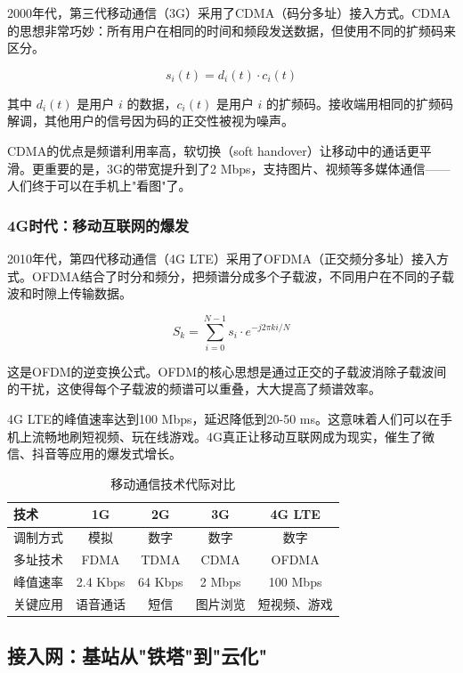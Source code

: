 2000年代，第三代移动通信（3G）采用了CDMA（码分多址）接入方式。CDMA的思想非常巧妙：所有用户在相同的时间和频段发送数据，但使用不同的扩频码来区分。

\begin{equation}
s_i(t) = d_i(t) \cdot c_i(t)
\end{equation}

其中 $d_i(t)$ 是用户 $i$ 的数据，$c_i(t)$ 是用户 $i$ 的扩频码。接收端用相同的扩频码解调，其他用户的信号因为码的正交性被视为噪声。

CDMA的优点是频谱利用率高，软切换（soft handover）让移动中的通话更平滑。更重要的是，3G的带宽提升到了2 Mbps，支持图片、视频等多媒体通信——人们终于可以在手机上"看图"了。

\subsubsection{4G时代：移动互联网的爆发}

2010年代，第四代移动通信（4G LTE）采用了OFDMA（正交频分多址）接入方式。OFDMA结合了时分和频分，把频谱分成多个子载波，不同用户在不同的子载波和时隙上传输数据。

\begin{equation}
S_k = \sum_{i=0}^{N-1} s_i \cdot e^{-j 2\pi ki/N}
\end{equation}

这是OFDM的逆变换公式。OFDM的核心思想是通过正交的子载波消除子载波间的干扰，这使得每个子载波的频谱可以重叠，大大提高了频谱效率。

4G LTE的峰值速率达到100 Mbps，延迟降低到20-50 ms。这意味着人们可以在手机上流畅地刷短视频、玩在线游戏。4G真正让移动互联网成为现实，催生了微信、抖音等应用的爆发式增长。

\begin{table}[htbp]
\centering
\caption{移动通信技术代际对比}
\begin{tabular}{|l|c|c|c|c|}
\hline
\textbf{技术} & \textbf{1G} & \textbf{2G} & \textbf{3G} & \textbf{4G LTE} \\
\hline
调制方式 & 模拟 & 数字 & 数字 & 数字 \\
多址技术 & FDMA & TDMA & CDMA & OFDMA \\
峰值速率 & 2.4 Kbps & 64 Kbps & 2 Mbps & 100 Mbps \\
关键应用 & 语音通话 & 短信 & 图片浏览 & 短视频、游戏 \\
\hline
\end{tabular}
\end{table}

\subsection{接入网：基站从"铁塔"到"云化"}

